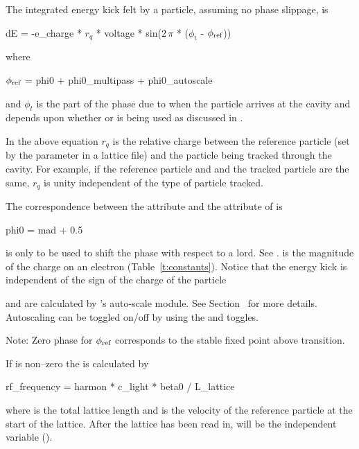 {The integrated energy kick felt by a particle, assuming no phase slippage, is 
\begin{example}
  dE = -e_charge * \(r_q\) * voltage * sin(\(2\,\pi\) * (\(\phi_\text{t}\) - \(\phi_{\text{ref}}\)))
\end{example}
where
\begin{example}
  \(\phi_{\text{ref}}\) = phi0 + phi0_multipass + phi0_autoscale
  \label{rfcav.phi}
\end{example}
and $\phi_t$ is the part of the phase due to when the particle arrives at the cavity and depends
upon whether  or  is being used as discussed
in .

In the above equation $r_q$ is the relative charge between the reference particle (set by the
 parameter in a lattice file) and the particle being tracked through the
cavity. For example, if the reference particle and and the tracked particle are the same, $r_q$ is
unity independent of the type of particle tracked.

The correspondence between the \bmad {} attribute and the  attribute of
\mad is
\begin{example}
  phi0 = mad + 0.5
\end{example}

 is only to be used to shift the phase with respect to a  lord. See
.  is the magnitude of the charge on an electron
(Table~\ref{t:constants}). Notice that the energy kick is independent of the sign of the charge of
the particle

 and  are calculated by \bmad's auto-scale module. See
Section~ for more details. Autoscaling can be toggled on/off by using the
 and  toggles.

Note: Zero phase for $\phi_{\text{ref}}$ corresponds to the stable fixed point above transition.

If  is non--zero the  is calculated by
\begin{example}
  rf_frequency = harmon * c_light * beta0 / L_lattice 
\end{example}
where  is the total lattice length and  is the
velocity of the reference particle at the start of the lattice. After
the lattice has been read in,  will be the
independent variable ().

}
